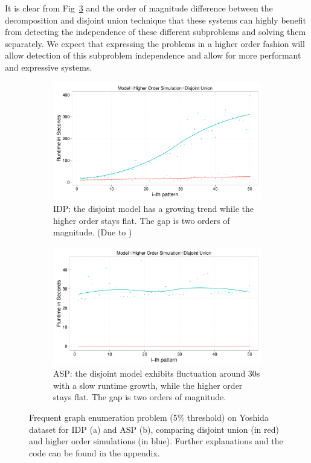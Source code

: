 It is clear from Fig~\ref{fig:decomposition_fol} and the order of magnitude difference between the decomposition and disjoint union technique that these systems can highly benefit from detecting the independence of these different subproblems and solving them separately.
We expect that expressing the problems in a higher order fashion will allow detection of this subproblem independence and allow for more performant and expressive systems.
\begin{figure}[thb]
\centering
\begin{subfigure}{.44\textwidth}
  \centering
\includegraphics[scale=0.14]{extra/figure_comparison_yoshida.pdf}
\caption{\footnotesize{IDP: the disjoint model has a growing trend while the higher order stays flat. The gap is two orders of magnitude. (Due to \cite{ilp_graph_mining})}}
  \label{fig:decomposition_idp}
\end{subfigure}%
\hfill
\begin{subfigure}{0.46\textwidth}
  \centering
 \includegraphics[scale=0.14]{extra/asp_fol_vs_decomposed_yoshida.pdf}
 \caption{\footnotesize{ASP: the disjoint model exhibits fluctuation around 30s with a slow runtime growth, while the higher order stays flat. The gap is two orders of magnitude.}}
  \label{fig:decomposition_asp}
\end{subfigure}
\caption{\footnotesize{Frequent graph enumeration problem (5\% threshold) on Yoshida dataset for IDP (a) and ASP (b), comparing disjoint union (in red) and higher order simulations (in blue). Further explanations and the code can be found in the appendix.}}
\label{fig:decomposition_fol}
\end{figure}
